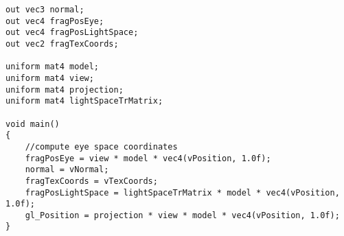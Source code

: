 \begin{itemize}
\begin{verbatim}
out vec3 normal;
out vec4 fragPosEye;
out vec4 fragPosLightSpace;
out vec2 fragTexCoords;

uniform mat4 model;
uniform mat4 view;
uniform mat4 projection;
uniform mat4 lightSpaceTrMatrix;

void main() 
{
	//compute eye space coordinates
	fragPosEye = view * model * vec4(vPosition, 1.0f);
	normal = vNormal;
	fragTexCoords = vTexCoords;
	fragPosLightSpace = lightSpaceTrMatrix * model * vec4(vPosition, 1.0f);
	gl_Position = projection * view * model * vec4(vPosition, 1.0f);
}

	\end{verbatim}
	\tab 
\end{itemize}
